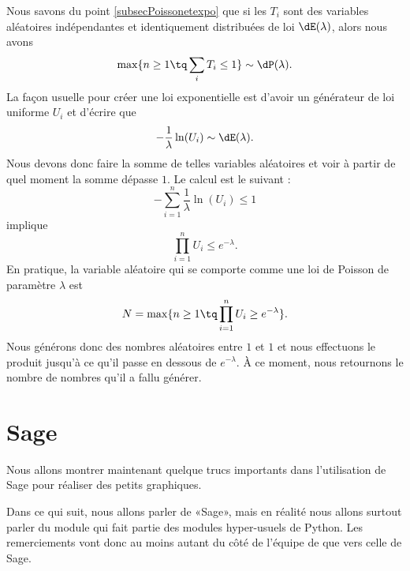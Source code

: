 Nous savons du point \ref{subsecPoissonetexpo} que si les \( T_i\) sont des variables aléatoires indépendantes et identiquement distribuées de loi \( \dE(\lambda)\), alors nous avons
\begin{equation}
    \max\{ n\geq 1\tq\sum_iT_i\leq 1 \}\sim\dP(\lambda).
\end{equation}
La façon usuelle pour créer une loi exponentielle est d'avoir un générateur de loi uniforme \( U_i\) et d'écrire que
\begin{equation}
    -\frac{1}{ \lambda }\ln(U_i)\sim \dE(\lambda).
\end{equation}
Nous devons donc faire la somme de telles variables aléatoires et voir à partir de quel moment la somme dépasse \( 1\). Le calcul est le suivant :
\begin{equation}
    -\sum_{i=1}^{n}\frac{1}{ \lambda }\ln(U_i)\leq 1
\end{equation}
implique
\begin{equation}
    \prod_{i=1}^nU_i\leq  e^{-\lambda}.
\end{equation}
En pratique, la variable aléatoire qui se comporte comme une loi de Poisson de paramètre \( \lambda\) est
\begin{equation}
    N=\max\{ n\geq 1\tq \prod_{i=1}^nU_i\geq e^{-\lambda} \}.
\end{equation}
Nous générons donc des nombres aléatoires entre \( 1\) et \( 1\) et nous effectuons le produit jusqu'à ce qu'il passe en dessous de \(  e^{-\lambda}\). À ce moment, nous retournons le nombre de nombres qu'il a fallu générer.

\section{Sage}

Nous allons montrer maintenant quelque trucs importants dans l'utilisation de Sage pour réaliser des petits graphiques. 

\begin{remark}
    Dans ce qui suit, nous allons parler de «Sage», mais en réalité nous allons surtout parler du module  qui fait partie des modules hyper-usuels de Python. Les remerciements vont donc au moins autant du côté de l'équipe de  que vers celle de Sage.
\end{remark}

